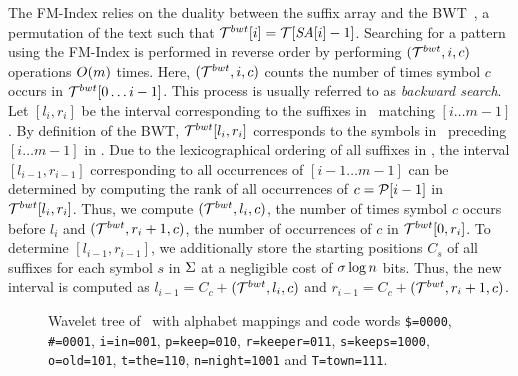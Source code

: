 The FM-Index relies on the duality between the suffix array and the BWT~\cite{bw-dec94}, 
a permutation of the text such that $\mathcal{T}^{bwt}[i] = \mathcal{T}[\mbox{\emph{SA}}[i]-1]$. Searching for
a pattern using the FM-Index is performed in reverse order by performing  
{\rankop$(\mathcal{T}^{bwt},i,c)$} operations $O(m)$ times. Here, {\rankop$(\mathcal{T}^{bwt},i,c)$}  
counts the number of times symbol $c$ occurs in $\mathcal{T}^{bwt}[0\ldots i-1]$. 
This process is usually referred to as {\it backward search}. Let \SA$[l_i,r_i]$ be
the interval corresponding to the suffixes in \col\ matching \pattern$[i\ldots m-1]$.
By definition of the BWT, $\mathcal{T}^{bwt}[l_i,r_i]$ corresponds to the symbols in \col\
preceding \pattern$[i\ldots m-1]$ in \col. Due to the lexicographical ordering
of all suffixes in \SA, the interval \SA$[l_{i-1},r_{i-1}]$ corresponding to all
occurrences of \pattern$[i-1\ldots m-1]$ can be determined by computing the rank
of all occurrences of $c=\mathcal{P}[i-1]$ in $\mathcal{T}^{bwt}[l_i,r_i]$. Thus, we compute
\rankop$(\mathcal{T}^{bwt},l_i,c)$, the number of times symbol $c$ occurs before
$l_i$ and \rankop$(\mathcal{T}^{bwt},r_i+1,c)$, the number of occurrences of $c$ in $\mathcal{T}^{bwt}[0,r_i]$.
To determine \SA$[l_{i-1},r_{i-1}]$, we additionally store the starting positions $C_{s}$
of all suffixes for each symbol $s$ in $\Sigma$ at a negligible cost 
of $\sigma \log n$ bits.
Thus, the new interval is computed as $l_{i-1} = C_c + $\rankop$(\mathcal{T}^{bwt},l_i,c)$ 
and $r_{i-1} = C_c + $\rankop$(\mathcal{T}^{bwt},r_i+1,c)$.

\begin{figure}[tb]
\centering

\caption{Wavelet tree of \colbwt\ with alphabet mappings and code words {\tt \$=0000}, {\tt \#=0001}, 
{\tt i=in=001}, {\tt p=keep=010}, {\tt r=keeper=011}, {\tt s=keeps=1000}, 
{\tt o=old=101}, {\tt t=the=110}, {\tt n=night=1001} and {\tt T=town=111}.}
\label{fig-wt-bwt}
\end{figure}


